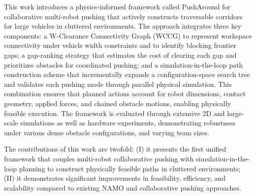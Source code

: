 This work introduces a physics-informed framework called PushAround for collaborative multi-robot
pushing that actively constructs traversable corridors for large vehicles in
cluttered environments. The approach integrates three key components: a
W-Clearance Connectivity Graph (WCCG) to represent workspace connectivity under
vehicle width constraints and to identify blocking frontier gaps; a gap-ranking
strategy that estimates the cost of clearing each gap and prioritizes obstacles
for coordinated pushing; and a simulation-in-the-loop path construction scheme
that incrementally expands a configuration-space search tree and validates each
pushing mode through parallel physical simulation. This combination ensures that
planned actions account for robot dimensions, contact geometry, applied forces,
and chained obstacle motions, enabling physically feasible execution. The
framework is evaluated through extensive 2D and large-scale simulations as well
as hardware experiments, demonstrating robustness
under various dense obstacle configurations, and varying
team sizes.

The contributions of this work are twofold: (I) it presents the first unified
framework that couples multi-robot collaborative pushing with simulation-in-the-loop
planning to construct physically feasible paths in cluttered environments; (II)
it demonstrates significant improvements in feasibility, efficiency,
and scalability compared to existing NAMO and collaborative pushing approaches.
